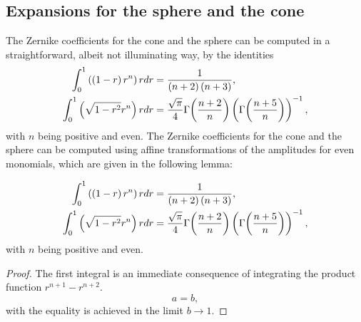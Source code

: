 \documentclass[preprint,12pt]{elsarticle}
\begin{document}
\subsection{Expansions for the sphere and the cone}
The Zernike coefficients for the cone and the sphere can be computed in a straightforward, albeit not illuminating way, by the identities
\begin{equation}
    \begin{split}
          \int_{0}^{1} \left( \left( 1-r \right)r^{n} \right)rdr 
      &= \frac{1}{\left( n+2 \right)\left( n+3 \right)}, \\
    \int_{0}^{1} \left( \sqrt{1-r^{2}} r^{n} \right)rdr 
      &= \frac{\sqrt{\pi}}{4} \Gamma{ \left( \frac{n+2}{n} \right) }  \left( \Gamma{ \left( \frac{n+5}{n} \right) } \right)^{-1},
    \end{split}
    \label{eq:monomial}
\end{equation}
with $n$ being positive and even. 
The Zernike coefficients for the cone and the sphere can be computed using affine transformations of the amplitudes for even monomials, which are given in the following lemma:
{\color{blue}
\begin{myTheorem}  %
\begin{equation}
    \begin{split}
          \int_{0}^{1} \left( \left( 1-r \right)r^{n} \right)rdr 
      &= \frac{1}{\left( n+2 \right)\left( n+3 \right)}, \\
    \int_{0}^{1} \left( \sqrt{1-r^{2}} r^{n} \right)rdr 
      &= \frac{\sqrt{\pi}}{4} \Gamma{ \left( \frac{n+2}{n} \right) }  \left( \Gamma{ \left( \frac{n+5}{n} \right) } \right)^{-1},
    \end{split}
    \label{eq:monomial}
\end{equation}
with $n$ being positive and even. 
\end{myTheorem}  %
\begin{proof}  %
The first integral is an immediate consequence of integrating the product function $r^{n+1}-r^{n+2}$.
  \begin{equation}
   a = b ,
  \end{equation}
with the equality is achieved in the limit $b\to 1$.
\end{proof}  %
}
\end{document}
